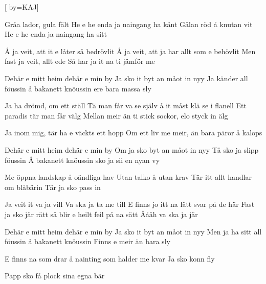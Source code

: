 

[ 		%
	by={KAJ}]						%
	

\beginverse*						%
Gråa lador, gula fält
He e he enda ja naingang ha känt
Gålan röd å knutan vit
He e he enda ja naingang ha sitt

Å ja veit, att it e låter så bedrövlit
Å ja veit, att ja har allt som e behövlit
Men fast ja veit, allt ede
Så har ja it na ti jämför me
\endverse							%

\beginchorus
Dehär e mitt heim
dehär e min by 
Ja sko it byt an måot in nyy
Ja känder all föussin
å bakanett knöussin
ere bara massa sly
\endchorus

\beginverse*						%
Ja ha drömd, om ett ställ
Tä man får va se själv å it måst klä se i flanell
Ett paradis tär man får välg
Mellan meir än ti stick sockor, elo styck in älg

Ja inom mig, tär ha e väckts ett hopp
Om ett liv me meir, än bara päror å kalops
\endverse							%

\beginchorus
Dehär e mitt heim
dehär e min by 
Om ja sko byt an måot in nyy
Tå sko ja slipp föussin
Å bakanett knöussin
sko ja sii en nyan vy
\endchorus

\beginverse*						%
Me öppna landskap å oändliga hav
Utan talko å utan krav
Tär itt allt handlar om blåbärin
Tär ja sko pass in

Ja veit it va ja vill
Va ska ja ta me till
E finns jo itt na lätt svar på de här
Fast ja sko jär rätt 
så blir e heilt feil på na sätt
Åååh va ska ja jär
\endverse							%

\beginchorus
Dehär e mitt heim
dehär e min by 
Ja sko it byt an måot in nyy
Men ja ha sitt all föussin
å bakanett knöussin
Finns e meir än bara sly
\endchorus

\beginverse*						%
E finns na som drar
å nainting som halder me kvar
Ja sko konn fly

Papp sko få plock sina egna bär
\endverse							%

\endsong							%